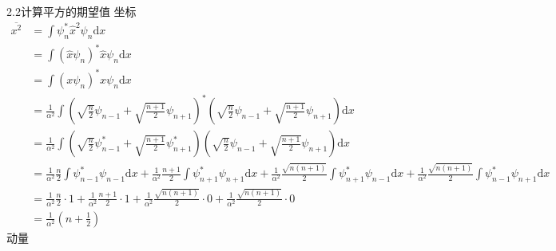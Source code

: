 2.2计算平方的期望值
坐标
\begin{equation}
    \begin{aligned}
        \overline{x^2}&=\int{\psi _{n}^{*}\hat{x}^2\psi _n\mathrm{d}x}
\\
&=\int{\left( \hat{x}\psi _n \right) ^*\hat{x}\psi _n\mathrm{d}x}
\\
&=\int{\left( x\psi _n \right) ^*x\psi _n\mathrm{d}x}
\\
&=\frac{1}{\alpha ^2}\int{\left( \sqrt{\frac{n}{2}}\psi _{n-1}+\sqrt{\frac{n+1}{2}}\psi _{n+1} \right) ^*\left( \sqrt{\frac{n}{2}}\psi _{n-1}+\sqrt{\frac{n+1}{2}}\psi _{n+1} \right) \mathrm{d}x}
\\
&=\frac{1}{\alpha ^2}\int{\left( \sqrt{\frac{n}{2}}\psi _{n-1}^{*}+\sqrt{\frac{n+1}{2}}\psi _{n+1}^{*} \right) \left( \sqrt{\frac{n}{2}}\psi _{n-1}+\sqrt{\frac{n+1}{2}}\psi _{n+1} \right) \mathrm{d}x}
\\
&=\frac{1}{\alpha ^2}\frac{n}{2}\int{\psi _{n-1}^{*}\psi _{n-1}\mathrm{d}x}+\frac{1}{\alpha ^2}\frac{n+1}{2}\int{\psi _{n+1}^{*}\psi _{n+1}\mathrm{d}x}+\frac{1}{\alpha ^2}\frac{\sqrt{n\left( n+1 \right)}}{2}\int{\psi _{n+1}^{*}\psi _{n-1}\mathrm{d}x}+\frac{1}{\alpha ^2}\frac{\sqrt{n\left( n+1 \right)}}{2}\int{\psi _{n-1}^{*}\psi _{n+1}\mathrm{d}x}
\\
&=\frac{1}{\alpha ^2}\frac{n}{2}\cdot 1+\frac{1}{\alpha ^2}\frac{n+1}{2}\cdot 1+\frac{1}{\alpha ^2}\frac{\sqrt{n\left( n+1 \right)}}{2}\cdot 0+\frac{1}{\alpha ^2}\frac{\sqrt{n\left( n+1 \right)}}{2}\cdot 0
\\
&=\frac{1}{\alpha ^2}\left( n+\frac{1}{2} \right) 
    \end{aligned}
\end{equation}
动量
